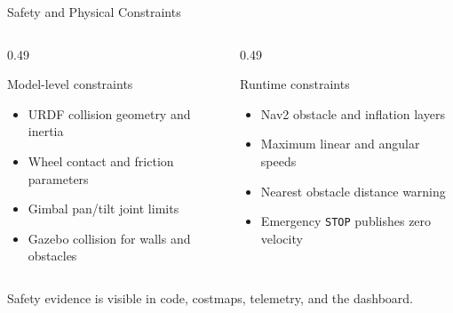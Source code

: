 \documentclass[aspectratio=169,11pt]{beamer}
\begin{document}
\begin{frame}{Safety and Physical Constraints}
  \begin{columns}[T,onlytextwidth]
    \begin{column}{0.49\textwidth}
      \begin{block}{Model-level constraints}
        \begin{itemize}
          \item URDF collision geometry and inertia
          \item Wheel contact and friction parameters
          \item Gimbal pan/tilt joint limits
          \item Gazebo collision for walls and obstacles
        \end{itemize}
      \end{block}
    \end{column}
    \begin{column}{0.49\textwidth}
      \begin{block}{Runtime constraints}
        \begin{itemize}
          \item Nav2 obstacle and inflation layers
          \item Maximum linear and angular speeds
          \item Nearest obstacle distance warning
          \item Emergency \texttt{STOP} publishes zero velocity
        \end{itemize}
      \end{block}
    \end{column}
  \end{columns}

  \vspace{0.7em}
  \begin{center}
    \large Safety evidence is visible in code, costmaps, telemetry, and the dashboard.
  \end{center}
\end{frame}
\end{document}
